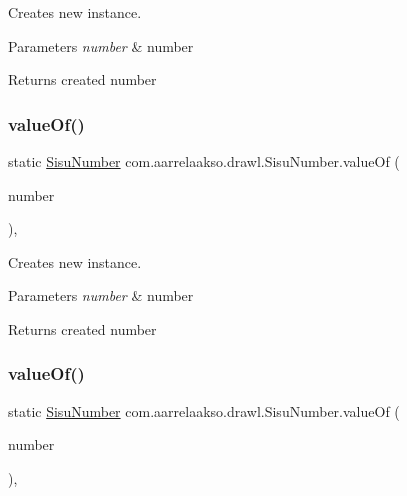 Creates new instance. 


\begin{DoxyParams}{Parameters}
{\em number} & number \\
\hline
\end{DoxyParams}
\begin{DoxyReturn}{Returns}
created number 
\end{DoxyReturn}
\mbox{\label{classcom_1_1aarrelaakso_1_1drawl_1_1_sisu_number_a04be5a20a778dce44af12645b2d6bbc9}} 
\subsubsection{\texorpdfstring{value\+Of()}{valueOf()}\hspace{0.1cm}{\footnotesize\ttfamily [3/4]}}
{\footnotesize\ttfamily static \hyperlink{classcom_1_1aarrelaakso_1_1drawl_1_1_sisu_number}{Sisu\+Number} com.\+aarrelaakso.\+drawl.\+Sisu\+Number.\+value\+Of (\begin{DoxyParamCaption}\item[{@Not\+Null Big\+Decimal}]{number }\end{DoxyParamCaption})\hspace{0.3cm}{\ttfamily [static]}, {\ttfamily [protected]}}



Creates new instance. 


\begin{DoxyParams}{Parameters}
{\em number} & number \\
\hline
\end{DoxyParams}
\begin{DoxyReturn}{Returns}
created number 
\end{DoxyReturn}
\mbox{\label{classcom_1_1aarrelaakso_1_1drawl_1_1_sisu_number_accb397fda90ea57fefeab7da195d4dd0}} 
\subsubsection{\texorpdfstring{value\+Of()}{valueOf()}\hspace{0.1cm}{\footnotesize\ttfamily [4/4]}}
{\footnotesize\ttfamily static \hyperlink{classcom_1_1aarrelaakso_1_1drawl_1_1_sisu_number}{Sisu\+Number} com.\+aarrelaakso.\+drawl.\+Sisu\+Number.\+value\+Of (\begin{DoxyParamCaption}\item[{Integer}]{number }\end{DoxyParamCaption})\hspace{0.3cm}{\ttfamily [static]}, {\ttfamily [protected]}}



